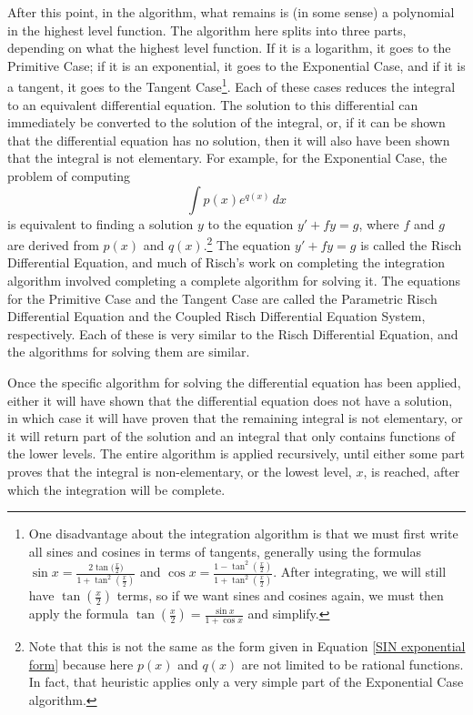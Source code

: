 After this point, in the algorithm, what remains is (in some sense) a
polynomial in the highest level function.  The algorithm here splits
into three parts, depending on what the highest level function.  If it
is a logarithm, it goes to the Primitive Case; if it is an exponential,
it goes to the Exponential Case, and if it is a tangent, it goes to the
Tangent Case\footnote{One disadvantage about the integration algorithm
is that we must first write all sines and cosines in terms of tangents,
generally using the formulas $\sin{x} = \frac{2\tan{(\frac{x}{2}})}{1 +
\tan^2{(\frac{x}{2})}}$ and $\cos{x} = \frac{1 -
\tan^2{(\frac{x}{2})}}{1 + \tan^2{(\frac{x}{2})}}$.  After integrating,
we will still have $\tan{(\frac{x}{2})}$ terms, so if we want sines and
cosines again, we must then apply the formula $\tan{(\frac{x}{2})} =
\frac{\sin{x}}{1 + \cos{x}}$ and simplify.}.  Each of these cases
reduces the integral to an equivalent differential equation.  The
solution to this differential can immediately be converted to the
solution of the integral, or, if it can be shown that the differential
equation has no solution, then it will also have been shown that the
integral is not \gls{elementary}.  For example, for the Exponential
Case, the problem of computing
\begin{equation}
\label{exponential case}
\int{p(x)e^{q(x)}\,dx}
\end{equation}
is equivalent to finding a solution $y$ to the equation $y' + fy = g$,
where $f$ and $g$ are derived from $p(x)$ and $q(x)$.\footnote{Note that
this is not the same as the form given in Equation \ref{SIN exponential
form} because here $p(x)$ and $q(x)$ are not limited to be
\glspl{rational function}.  In fact, that heuristic applies only a very
simple part of the Exponential Case algorithm.}  The equation $y' + fy =
g$ is called the Risch Differential Equation, and much of Risch's work
on completing the integration algorithm involved completing a complete
algorithm for solving it.  The equations for the Primitive Case and the
Tangent Case are called the Parametric Risch Differential Equation and
the Coupled Risch Differential Equation System, respectively.  Each of
these is very similar to the Risch Differential Equation, and the
algorithms for solving them are similar.

Once the specific algorithm for solving the differential equation has
been applied, either it will have shown that the differential equation
does not have a solution, in which case it will have proven that the
remaining integral is not elementary, or it will return part of the
solution and an integral that only contains functions of the lower
levels.  The entire algorithm is applied recursively, until either some
part proves that the integral is non-\gls{elementary}, or the lowest
level, $x$, is reached, after which the integration will be complete.  